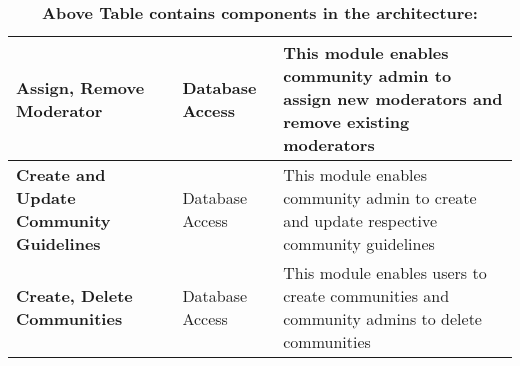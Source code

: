 \documentclass[11pt]{article}
\begin{document}
\begin{table}[H]
\begin{tabular}{|p{4cm}|p{4cm}|p{10cm}|}
        \\\hline
        \textbf{Assign, Remove Moderator} & Database Access & This module enables community admin to assign new moderators and remove existing moderators
        \\\hline
        \textbf{Create and Update Community Guidelines} & Database Access & This module enables community admin to create and update respective community guidelines
        \\\hline
        \textbf{Create, Delete Communities} & Database Access & This module enables users to create communities and community admins to delete communities
        \\\hline
    \end{tabular}
    \caption{\textbf{Above Table contains components in the architecture:}}
\end{table}
\end{document}

